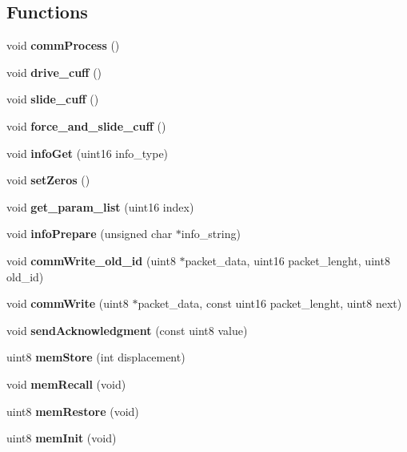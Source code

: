 \subsection*{Functions}
\begin{DoxyCompactItemize}
\item 
\mbox{\label{command__processing_8c_a2e5d1711e19837adc3e8f479af3ae509}} 
void {\bfseries comm\+Process} ()
\item 
\mbox{\label{command__processing_8c_a8d9f34c84c2a23fa548a5266aa8227a6}} 
void {\bfseries drive\+\_\+cuff} ()
\item 
\mbox{\label{command__processing_8c_a6a2c32899a5eea25c6f4a9b46f78a627}} 
void {\bfseries slide\+\_\+cuff} ()
\item 
\mbox{\label{command__processing_8c_a6d07d0d461f026726b88e1dda1a89ff3}} 
void {\bfseries force\+\_\+and\+\_\+slide\+\_\+cuff} ()
\item 
\mbox{\label{command__processing_8c_a525ccbc7ac3901d938dc352172ee2531}} 
void {\bfseries info\+Get} (uint16 info\+\_\+type)
\item 
\mbox{\label{command__processing_8c_ac8969cb5fdb4916f259075029741e727}} 
void {\bfseries set\+Zeros} ()
\item 
\mbox{\label{command__processing_8c_a5ef086c932682ca5f7549b74ead732aa}} 
void {\bfseries get\+\_\+param\+\_\+list} (uint16 index)
\item 
\mbox{\label{command__processing_8c_abacf855ed80e3052a5bb5b243a0d809e}} 
void {\bfseries info\+Prepare} (unsigned char $\ast$info\+\_\+string)
\item 
\mbox{\label{command__processing_8c_a517f4c61166381d40767fce9011e3c96}} 
void {\bfseries comm\+Write\+\_\+old\+\_\+id} (uint8 $\ast$packet\+\_\+data, uint16 packet\+\_\+lenght, uint8 old\+\_\+id)
\item 
\mbox{\label{command__processing_8c_a1a4919b18b8f9ea21abebd5836a8f35a}} 
void {\bfseries comm\+Write} (uint8 $\ast$packet\+\_\+data, const uint16 packet\+\_\+lenght, uint8 next)
\item 
\mbox{\label{command__processing_8c_af4a42b25376d2efd09096cbbed2fbce4}} 
void {\bfseries send\+Acknowledgment} (const uint8 value)
\item 
uint8 \textbf{ mem\+Store} (int displacement)
\item 
void \textbf{ mem\+Recall} (void)
\item 
uint8 \textbf{ mem\+Restore} (void)
\item 
uint8 \textbf{ mem\+Init} (void)
\item 

\end{DoxyCompactItemize}
